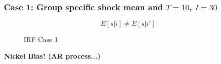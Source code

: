 \documentclass[notes,11pt, aspectratio = 169]{beamer}
\begin{document}
\begin{frame}
    \frametitle{Case 1: Group specific shock mean and $T=10$, $I=30$}
    \[E[s|i] \neq E[s|i'] \] 
    
    
\begin{figure}
    \centering
  \caption{IRF Case 1}
  \end{figure}
  
\textbf{Nickel Bias! (AR process...)}  
\end{frame}
\end{document}
